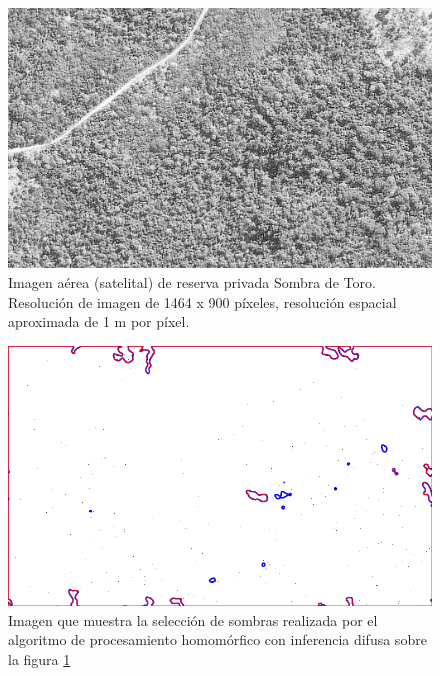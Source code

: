 \begin{figure}[h!]
    \includegraphics[width=\textwidth]{Imagenes/Homomorfico/ST2.png}
     \hfill
     \caption{Imagen aérea (satelital) de reserva privada Sombra de Toro. Resolución de imagen de 1464 x 900 píxeles, resolución espacial aproximada de  1 m por píxel.}
    \label{ST2_gris}
\end{figure}

\begin{figure}[h!]
    \includegraphics[width=\textwidth]{Imagenes/Homomorfico/ST2_fuzzy.png}
     \hfill
     \caption{Imagen que muestra la selección de sombras realizada por el algoritmo de procesamiento homomórfico con inferencia difusa sobre la figura \ref{ST2_gris}}
    \label{ST2_difuso}
\end{figure}

